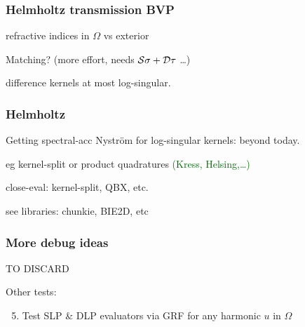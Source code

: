 \documentclass[t]{beamer}
\newcommand{\ft}[1]{\frametitle{#1}}
\newcommand{\ben}{\begin{enumerate}}
\newcommand{\een}{\end{enumerate}}
\newcommand{\who}[1]{{\scriptsize \textcolor{darkgreen}{(#1)}}}  %
\newcommand{\Srep}{{\cal S}}
\newcommand{\Drep}{{\cal D}}
\begin{document}
\begin{frame}\ft{Helmholtz transmission BVP}

refractive indices in $\Omega$ vs exterior
  
  Matching? (more effort, needs $\Srep \sigma + \Drep \tau$ \dots)
  
  difference kernels at most log-singular.
  
\end{frame}

\begin{frame}\ft{Helmholtz}


  Getting spectral-acc Nystr\"om for log-singular kernels: beyond today.

  eg kernel-split or product quadratures \who{Kress, Helsing,\dots}

  close-eval: kernel-split, QBX, etc.
  
  see libraries: chunkie, BIE2D, etc

  \end{frame}



\begin{frame}\ft{More debug ideas}

TO DISCARD
  
  

Other tests:

\ben
\setcounter{enumi}{4}
\item Test SLP \& DLP evaluators via GRF for any harmonic $u$ in $\Omega$
\een

\end{frame}
\end{document}
